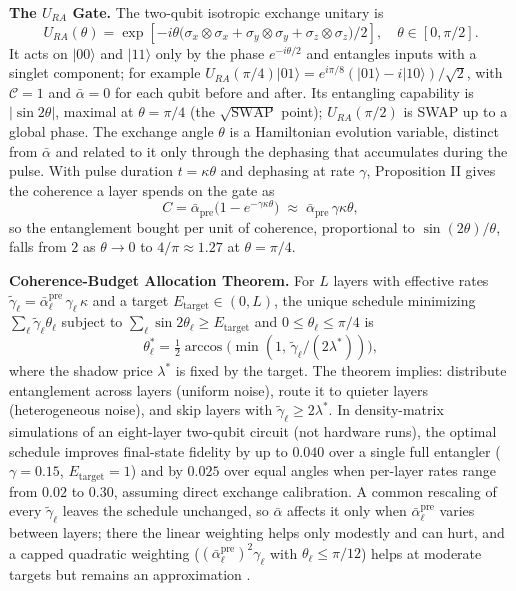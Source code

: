 \begin{tcolorbox}[
  title={The Formal Mathematics: For Readers Who Want It},
  colback=gray!5,
  colframe=gray!50,
  fonttitle=\bfseries,
  breakable
]
\textbf{The $U_{RA}$ Gate.} The two-qubit isotropic exchange unitary is
$$U_{RA}(\theta) = \exp\!\left[-i\theta\bigl(\sigma_x \otimes \sigma_x + \sigma_y \otimes \sigma_y + \sigma_z \otimes \sigma_z\bigr)/2\right], \quad \theta \in [0, \pi/2].$$
It acts on $|00\rangle$ and $|11\rangle$ only by the phase $e^{-i\theta/2}$ and entangles inputs with a singlet component; for example $U_{RA}(\pi/4)|01\rangle = e^{i\pi/8}(|01\rangle - i|10\rangle)/\sqrt{2}$, with $\mathcal{C} = 1$ and $\bar{\alpha} = 0$ for each qubit before and after. Its entangling capability is $|\sin 2\theta|$, maximal at $\theta = \pi/4$ (the $\sqrt{\mathrm{SWAP}}$ point); $U_{RA}(\pi/2)$ is SWAP up to a global phase. The exchange angle $\theta$ is a Hamiltonian evolution variable, distinct from $\bar{\alpha}$ and related to it only through the dephasing that accumulates during the pulse. With pulse duration $t = \kappa\theta$ and dephasing at rate $\gamma$, Proposition II gives the coherence a layer spends on the gate as
$$C = \bar{\alpha}_{\mathrm{pre}}\bigl(1 - e^{-\gamma\kappa\theta}\bigr) \;\approx\; \bar{\alpha}_{\mathrm{pre}}\,\gamma\kappa\theta,$$
so the entanglement bought per unit of coherence, proportional to $\sin(2\theta)/\theta$, falls from $2$ as $\theta \to 0$ to $4/\pi \approx 1.27$ at $\theta = \pi/4$.

\textbf{Coherence-Budget Allocation Theorem.} For $L$ layers with effective rates $\tilde{\gamma}_\ell = \bar{\alpha}^{\mathrm{pre}}_\ell\,\gamma_\ell\,\kappa$ and a target $E_{\mathrm{target}} \in (0, L)$, the unique schedule minimizing $\sum_\ell \tilde{\gamma}_\ell\theta_\ell$ subject to $\sum_\ell \sin 2\theta_\ell \geq E_{\mathrm{target}}$ and $0 \leq \theta_\ell \leq \pi/4$ is
$$\theta_\ell^* = \tfrac{1}{2}\arccos\!\bigl(\min(1,\,\tilde{\gamma}_\ell/(2\lambda^*))\bigr),$$
where the shadow price $\lambda^*$ is fixed by the target. The theorem implies: distribute entanglement across layers (uniform noise), route it to quieter layers (heterogeneous noise), and skip layers with $\tilde{\gamma}_\ell \geq 2\lambda^*$. In density-matrix simulations of an eight-layer two-qubit circuit (not hardware runs), the optimal schedule improves final-state fidelity by up to $0.040$ over a single full entangler ($\gamma = 0.15$, $E_{\mathrm{target}} = 1$) and by $0.025$ over equal angles when per-layer rates range from $0.02$ to $0.30$, assuming direct exchange calibration. A common rescaling of every $\tilde{\gamma}_\ell$ leaves the schedule unchanged, so $\bar{\alpha}$ affects it only when $\bar{\alpha}^{\mathrm{pre}}_\ell$ varies between layers; there the linear weighting helps only modestly and can hurt, and a capped quadratic weighting ($(\bar{\alpha}^{\mathrm{pre}}_\ell)^2\gamma_\ell$ with $\theta_\ell \leq \pi/12$) helps at moderate targets but remains an approximation \citep{AdamsRCT}.

\end{tcolorbox}

